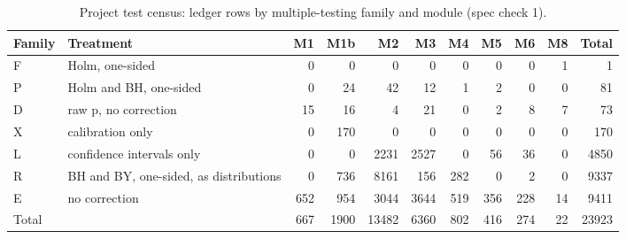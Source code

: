 \begin{table}[htbp]
\centering
\footnotesize
\caption{Project test census: ledger rows by multiple-testing family and module (spec check 1).}
\label{tab:m7_census}
\begin{tabular}{llrrrrrrrrr}
\toprule
Family & Treatment & M1 & M1b & M2 & M3 & M4 & M5 & M6 & M8 & Total \\
\midrule
F & Holm, one-sided & 0 & 0 & 0 & 0 & 0 & 0 & 0 & 1 & 1 \\
P & Holm and BH, one-sided & 0 & 24 & 42 & 12 & 1 & 2 & 0 & 0 & 81 \\
D & raw p, no correction & 15 & 16 & 4 & 21 & 0 & 2 & 8 & 7 & 73 \\
X & calibration only & 0 & 170 & 0 & 0 & 0 & 0 & 0 & 0 & 170 \\
L & confidence intervals only & 0 & 0 & 2231 & 2527 & 0 & 56 & 36 & 0 & 4850 \\
R & BH and BY, one-sided, as distributions & 0 & 736 & 8161 & 156 & 282 & 0 & 2 & 0 & 9337 \\
E & no correction & 652 & 954 & 3044 & 3644 & 519 & 356 & 228 & 14 & 9411 \\
Total &  & 667 & 1900 & 13482 & 6360 & 802 & 416 & 274 & 22 & 23923 \\
\bottomrule
\end{tabular}
\par{}
\end{table}
